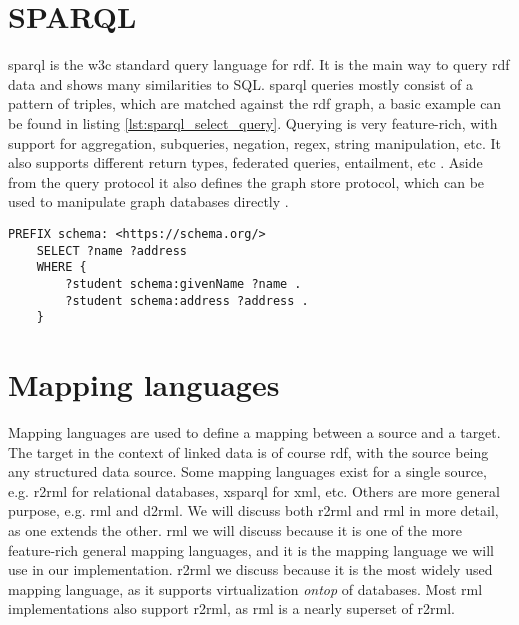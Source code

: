 \section{SPARQL}
\acrfull{sparql} is the \acrshort{w3c} standard query language for \acrshort{rdf}. It is the main way to query \acrshort{rdf} data and shows many similarities to SQL. \acrshort{sparql} queries mostly consist of a pattern of triples, which are matched against the \acrshort{rdf} graph, a basic example can be found in listing \ref{lst:sparql_select_query}. Querying is very feature-rich, with support for aggregation, subqueries, negation, regex, string manipulation, etc. It also supports different return types, federated queries, entailment, etc \citep{SPARQL1.1QL}. Aside from the query protocol it also defines the graph store protocol, which can be used to manipulate graph databases directly \citep{SPARQL1.1}. 

\begin{lstlisting}[language=SPARQL, caption={Example of a basic \acrshort{sparql} SELECT query}, label={lst:sparql_select_query}, captionpos=b]
    PREFIX schema: <https://schema.org/>
    SELECT ?name ?address
    WHERE {
        ?student schema:givenName ?name .
        ?student schema:address ?address .
    }
\end{lstlisting}

\section{Mapping languages}
Mapping languages are used to define a mapping between a source and a target. The target in the context of linked data is of course \acrshort{rdf}, with the source being any structured data source. Some mapping languages exist for a single source, e.g. \acrfull{r2rml} for relational databases, \acrfull{xsparql} for \acrshort{xml}, etc. Others are more general purpose, e.g. \acrfull{rml} and \acrfull{d2rml}. 
We will discuss both \acrshort{r2rml} and \acrshort{rml} in more detail, as one extends the other. \acrshort{rml} we will discuss because it is one of the more feature-rich general mapping languages, and it is the mapping language we will use in our implementation. \acrshort{r2rml} we discuss because it is the most widely used mapping language, as it supports virtualization \textit{ontop} of databases. %
Most \acrshort{rml} implementations also support \acrshort{r2rml}, as \acrshort{rml} is a nearly superset of \acrshort{r2rml}. 

